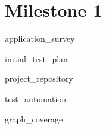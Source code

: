 \section{Milestone 1}

{application_survey}

{initial_test_plan}

{project_repository}

{test_automation}

{graph_coverage}
